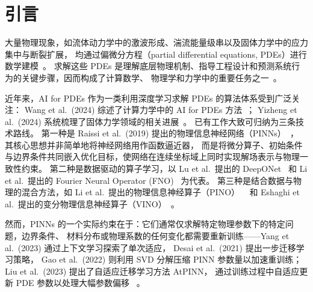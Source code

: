 \section{引言}
\label{sec:intro}

大量物理现象，如流体动力学中的激波形成、湍流能量级串以及固体力学中的应力集中与断裂扩展，
均通过偏微分方程（partial differential equations, PDEs）进行数学建模~\cite{evans2010pde}。
求解这些 PDEs 是理解底层物理机制、指导工程设计和预测系统行为的关键步骤，因而构成了计算数学、
物理学和力学中的重要任务之一~\cite{leveque2007finite}。

近年来，AI for PDEs 作为一类利用深度学习求解 PDEs 的算法体系受到广泛关注：
Wang et al.\ (2024) 综述了计算力学中的 AI for PDEs 方法~\cite{wang2024aipdesurvey}；
Yizheng et al.\ (2024) 系统梳理了固体力学领域的相关进展~\cite{wang2024aisolid}。
已有工作大致可归纳为三条技术路线。
第一种是 Raissi et al.\ (2019) 提出的物理信息神经网络（PINNs）~\cite{raissi2019pinn}，
其核心思想并非简单地将神经网络用作函数逼近器，
而是将微分算子、初始条件与边界条件共同嵌入优化目标，使网络在连续坐标域上同时实现解场表示与物理一致性约束。
第二种是数据驱动的算子学习，以 Lu et al.\ 提出的 DeepONet~\cite{lu2021deeponet} 和 Li et al.\ 提出的
Fourier
Neural Operator (FNO)~\cite{li2021fno} 为代表。
第三种是结合数据与物理的混合方法，如 Li et al.\ 提出的物理信息神经算子（PINO）
~\cite{li2024pino} 和 Eshaghi et al.\ 提出的变分物理信息神经算子（VINO）~\cite{eshaghi2025vino}。

然而，PINNs 的一个实际约束在于：它们通常仅求解特定物理参数下的特定问题，边界条件、
材料分布或物理系数的任何变化都需要重新训练——Yang et al.\ (2023) 通过上下文学习探索了单次适应，
Desai et al.\ (2021) 提出一步迁移学习策略，
Gao et al.\ (2022) 则利用 SVD 分解压缩 PINN 参数量以加速重训练；
Liu et al.\ (2023) 提出了自适应迁移学习方法 AtPINN，
通过训练过程中自适应更新 PDE 参数以处理大幅参数偏移~
\cite{yang2023incontext,desai2021oneshot,gao2022svdpinns,liu2023atpinn}。
